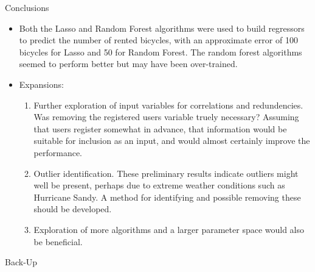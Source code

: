 \documentclass[pdf]{beamer}
\begin{document}

\begin{frame}{Conclusions}
\begin{itemize}
\item{Both the Lasso and Random Forest algorithms were used to build regressors to predict the number of rented bicycles, with an approximate error of 100 bicycles for Lasso and 50 for Random Forest.  The random forest algorithms seemed to perform better but may have been over-trained.}
\item{Expansions:}
\begin{enumerate}
\small
\item{Further exploration of input variables for correlations and redundencies.  Was removing the registered users variable truely necessary?  Assuming that users register somewhat in advance, that information would be suitable for inclusion as an input, and would almost certainly improve the performance.}
\item{Outlier identification.  These preliminary results indicate outliers might well be present, perhaps due to extreme weather conditions such as Hurricane Sandy.  A method for identifying and possible removing these should be developed.}
\item{Exploration of more algorithms and a larger parameter space would also be beneficial.}
\end{enumerate}
\end{itemize}
\end{frame}


\begin{frame}{Back-Up}
\end{frame}

\end{document}
